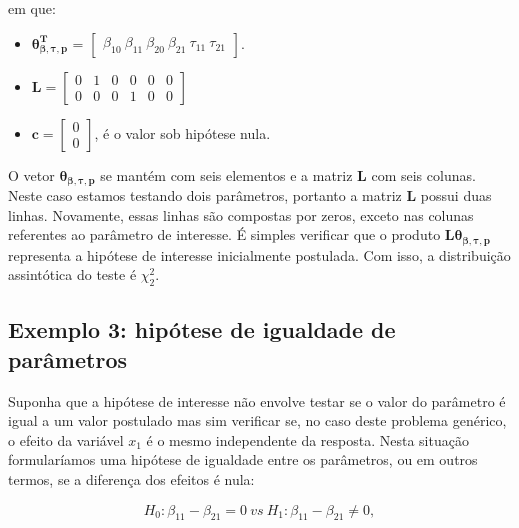 \noindent em que:

\begin{itemize}
  
  \item $\boldsymbol{\theta_{\beta,\tau,p}^T}$ = $\begin{bmatrix} \beta_{10} \  \beta_{11} \ \beta_{20} \ \beta_{21} \ \tau_{11} \ \tau_{21} \end{bmatrix}$.


\item $\boldsymbol{L} = \begin{bmatrix} 0 & 1 & 0 & 0 & 0 & 0 \\
0 & 0 & 0 & 1 & 0 & 0 \end{bmatrix}$
 
\item $\boldsymbol{c} = \begin{bmatrix} 0 \\ 0 \end{bmatrix}$, é o valor sob hipótese nula. 

\end{itemize}

O vetor $\boldsymbol{\theta_{\beta,\tau,p}}$ se mantém com seis elementos e a matriz $\boldsymbol{L}$ com seis colunas. Neste caso estamos testando dois parâmetros, portanto a matriz $\boldsymbol{L}$ possui duas linhas. Novamente, essas linhas são compostas por zeros, exceto nas colunas referentes ao parâmetro de interesse. É simples verificar que o produto $\boldsymbol{L}\boldsymbol{\theta_{\beta,\tau,p}}$ representa a hipótese de interesse inicialmente postulada. Com isso, a distribuição assintótica do teste é $\chi^2_2$.

\subsection{Exemplo 3: hipótese de igualdade de parâmetros}

Suponha que a hipótese de interesse não envolve testar se o valor do parâmetro é igual a um valor postulado mas sim verificar se, no caso deste problema genérico, o efeito da variável $x_1$ é o mesmo independente da resposta. Nesta situação formularíamos uma hipótese de igualdade entre os parâmetros, ou em outros termos, se a diferença dos efeitos é nula:

\begin{equation}
H_0: \beta_{11} - \beta_{21} = 0 \ vs \ H_1: \beta_{11} - \beta_{21} \neq 0,
\end{equation}

